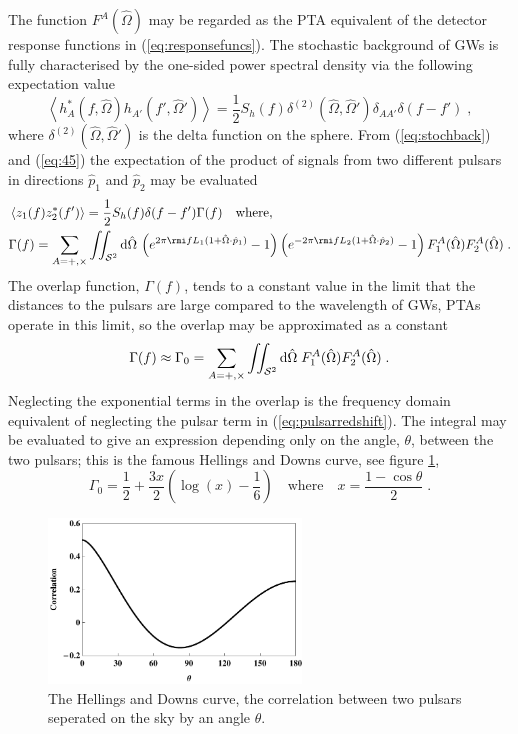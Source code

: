 The function $F^{A}(\hat{\Omega})$ may be regarded as the PTA equivalent of the detector response functions in (\ref{eq:responsefuncs}). The stochastic background of GWs is fully characterised by the one-sided power spectral density via the following expectation value
\begin{equation}\label{eq:stochback} \left<h_{A}^{*}(f,\hat{\Omega})h_{A'}(f',\hat{\Omega}')\right>=\frac{1}{2}S_{h}(f)\delta^{(2)}(\hat{\Omega},\hat{\Omega}')\delta_{AA'}\delta(f-f') \; ,\end{equation}
where $\delta^{(2)}(\hat{\Omega},\hat{\Omega}')$ is the delta function on the sphere. From (\ref{eq:stochback}) and (\ref{eq:45}) the expectation of the product of signals from two different pulsars in directions $\hat{p}_{1}$ and $\hat{p}_{2}$ may be evaluated
\begin{eqnarray} & \left<z_{1}(f)z_{2}^{*}(f')\right>=\frac{1}{2}S_{h}(f)\delta (f-f')\Gamma(f)\quad \mathrm{where,} \\
& \Gamma(f)=\sum_{A=+,\times}\iint_{{\cal{S}}^{2}}\mathrm{d}\hat{\Omega}\,\left(e^{2\pi\rmi fL_{1}(1+\hat{\Omega}\cdot\hat{p}_{1})}-1\right)\left(e^{-2\pi\rmi fL_{2}(1+\hat{\Omega}\cdot\hat{p}_{2})}-1\right)F_{1}^{A}(\hat{\Omega})F_{2}^{A}(\hat{\Omega}) \; . \nonumber\end{eqnarray}
The overlap function, $\Gamma(f)$, tends to a constant value in the limit that the distances to the pulsars are large compared to the wavelength of GWs, PTAs operate in this limit, so the overlap may be approximated as a constant 
\begin{equation} \Gamma(f)\approx\Gamma_{0}= \sum_{A=+,\times}\iint_{{\cal{S}}^{2}}\mathrm{d}\hat{\Omega}\;F_{1}^{A}(\hat{\Omega})F_{2}^{A}(\hat{\Omega})\;.\end{equation}
Neglecting the exponential terms in the overlap is the frequency domain equivalent of neglecting the pulsar term in (\ref{eq:pulsarredshift}). The integral may be evaluated to give an expression depending only on the angle, $\theta$, between the two pulsars; this is the famous Hellings and Downs curve, see figure \ref{fig:HnD},
\begin{equation} \Gamma_{0}=\frac{1}{2}+\frac{3x}{2}\left(\log (x)-\frac{1}{6}\right) \quad \mathrm{where}\quad x=\frac{1-\cos\theta}{2}\; .\end{equation}

\begin{figure}
 \centering
 \includegraphics[trim=0cm 0cm 0cm 0cm, width=0.6\textwidth]{HnDcurve.pdf}
 \caption{The Hellings and Downs curve, the correlation between two pulsars seperated on the sky by an angle $\theta$.}
 \label{fig:HnD}
\end{figure}

